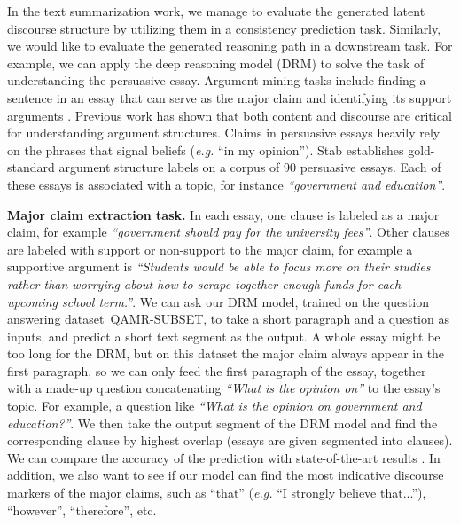 In the text summarization work, we manage to evaluate the generated latent discourse structure by utilizing them in a consistency prediction task. Similarly, we would like to evaluate the generated reasoning path in a downstream task. For example, we can apply the deep reasoning model (DRM) to solve the task of understanding the persuasive essay. %
Argument mining tasks include finding a sentence in an essay that can serve as the major claim and identifying its support arguments \cite{DBLP:conf/lrec/ReedPRM08}. Previous work \cite{DBLP:conf/emnlp/StabG14} has shown that both content and discourse are critical for understanding argument structures. Claims in persuasive essays heavily rely on the phrases that signal beliefs (\emph{e.g.} ``in my opinion'').  Stab \cite{DBLP:conf/coling/StabG14} establishes gold-standard argument structure labels on a corpus of 90 persuasive essays. Each of these essays is associated with a topic, for instance \textit{``government and education''}. 

\textbf{Major claim extraction task.} In each essay, one clause is labeled as a major claim, for example \textit{``government should pay for the university fees''}. Other clauses are labeled with support or non-support to the major claim, for example a supportive argument is \textit{``Students would be able to focus more on their studies rather than worrying about how to scrape together enough funds for each upcoming school term.''}. We can ask our DRM model, trained on the question answering dataset~\textsc{QAMR-SUBSET}, to take a short paragraph and a question as inputs, and predict a short text segment as the output. A whole essay might be too long for the DRM, but on this dataset the major claim always appear in the first paragraph, so we can only feed the first paragraph of the essay, together with a made-up question concatenating \textit{``What is the opinion on''} to the essay's topic. For example, a question like \textit{``What is the opinion on government and education?''}. We then take the output segment of the DRM model and find the corresponding clause by highest overlap (essays are given segmented into clauses). We can compare the accuracy of the prediction with state-of-the-art results \cite{DBLP:conf/emnlp/StabG14}. In addition, we also want to see if our model can find the most indicative discourse markers of the major claims, such as ``that'' (\emph{e.g.} ``I strongly believe that...''), ``however'', ``therefore'', etc.

